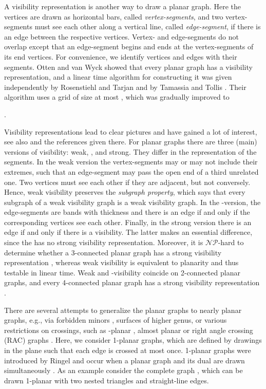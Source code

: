 \documentclass[runningheads]{llncs}
\newcommand{\NP}{\ensuremath{\mathcal{NP}}}
\begin{document}
A visibility representation is another way to draw a planar graph.
Here the vertices are drawn as horizontal bars, called
\emph{vertex-segments}, and two vertex-segments must see each other
along a vertical line, called \emph{edge-segment}, if there is an
edge between the respective vertices. Vertex- and edge-segments do
not overlap except that an edge-segment begins and ends at the
vertex-segments of its end vertices. For convenience, we identify
vertices and edges with their segments. Otten and van Wyck
\cite{ow-grild-78} showed that every planar graph has a visibility
representation, and a linear time algorithm for constructing it was
given independently by Rosenstiehl and Tarjan \cite{rt-rplbopg-86}
and by Tamassia and Tollis \cite{TT-vrpg-86}. Their algorithm uses a
grid of size at most , which was gradually
improved to
 
 \cite{flly-wovrpg-07}.



 Visibility representations lead to clear pictures and have gained a
 lot of interest, see also \cite{dett-gdavg-99} and the references given there.
 For planar
graphs there are  three (main) versions of visibility: weak,
, and strong.  They differ in the representation of the
segments. In the weak version the  vertex-segments may or may not
include their extremes, such that an edge-segment  may pass the open
end of a third unrelated one. Two vertices must see each other if
they are adjacent, but not conversely. Hence, weak visibility
preserves the \emph{subgraph property}, which says that every
subgraph of a weak visibility graph is a weak visibility graph. In
the -version, the edge-segments are bands with thickness
 and there is an edge if and only if the corresponding vertices
see each other.  Finally, in the strong version there is an edge if
and only if there is a visibility. The latter makes an essential
difference, since the  has no strong visibility
representation. Moreover, it is \NP-hard to determine whether a
3-connected planar graph has a strong visibility representation
\cite{a-rvg-92}, whereas weak visibility is equivalent to planarity
and thus testable in linear time. Weak and -visibility
coincide on 2-connected planar graphs, and every 4-connected planar
graph has a strong visibility representation \cite{TT-vrpg-86}.

There are several attempts to generalize the planar graphs to nearly
planar graphs, e.g., via forbidden minors \cite{rs-gmV-86}, surfaces
of higher genus, or various restrictions on crossings, such as
-planar \cite{pt-gdfce-97}, almost planar \cite{FPS-nekqpg-13} or
right angle crossing (RAC) graphs \cite{del-dgrac-11}. Here, we
consider 1-planar graphs, which are defined by drawings in the plane
such that each edge is crossed at most once. 1-planar graphs were
introduced by Ringel \cite{ringel-65} and occur when a planar graph
and its dual are drawn simultaneously \cite{ek-sepgd-05}. As an
example consider the complete graph , which can be drawn
1-planar with two nested triangles and straight-line edges.
\end{document}

